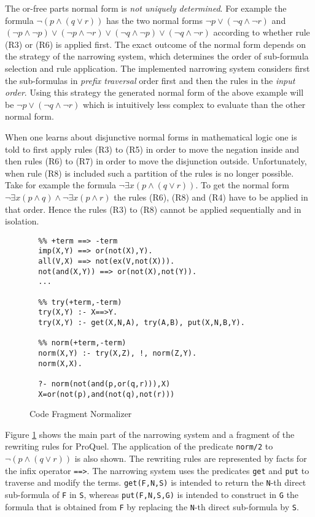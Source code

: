 The or-free parts normal form is {\em not uniquely determined}. For example the formula $\neg(p 
\wedge (q \vee r))$ has the two normal forms $\neg p \vee (\neg q \wedge \neg r)$ and $(\neg p 
\wedge \neg p)\vee (\neg p \wedge \neg r) \vee (\neg q \wedge \neg p) \vee (\neg q \wedge \neg r)$ 
according to whether rule (R3) or (R6) is applied first. The exact outcome of the normal form 
depends on the strategy of the narrowing system, which determines the order of sub-formula
selection and rule application. The implemented narrowing system considers first the
sub-formulas in {\em prefix traversal} order first and then the rules in the {\em input order}. 
Using this strategy the generated normal form of the above example will be $\neg p \vee 
(\neg q \wedge \neg r)$ which is intuitively less complex to evaluate than the other normal 
form.

When one learns about disjunctive normal forms in mathematical logic one is told to first 
apply rules (R3) to (R5) in order to move the negation inside and then rules (R6) to (R7) in
order to move the disjunction outside. Unfortunately, when rule (R8) is included such a 
partition of the rules is no longer possible. Take for example the formula $\neg \exists x 
(p\wedge (q \vee r))$. To get the normal form $\neg \exists x (p \wedge q) \wedge \neg \exists x
(p \wedge r)$ the rules (R6), (R8) and (R4) have to be applied in that order. Hence the rules
(R3) to (R8) cannot be applied sequentially and in isolation.

\begin{figure}
{\small
\begin{verbatim}
  %% +term ==> -term
  imp(X,Y) ==> or(not(X),Y).
  all(V,X) ==> not(ex(V,not(X))).
  not(and(X,Y)) ==> or(not(X),not(Y)).
  ...

  %% try(+term,-term)
  try(X,Y) :- X==>Y.
  try(X,Y) :- get(X,N,A), try(A,B), put(X,N,B,Y).

  %% norm(+term,-term)
  norm(X,Y) :- try(X,Z), !, norm(Z,Y).
  norm(X,X).

  ?- norm(not(and(p,or(q,r))),X)
  X=or(not(p),and(not(q),not(r)))
\end{verbatim}
}
\caption{Code Fragment Normalizer}
\label{prgnorm}
\end{figure}

Figure \ref{prgnorm} shows the main part of the narrowing system and a fragment of the rewriting
rules for ProQuel. The application of the predicate \verb.norm/2. to $\neg(p \wedge (q \vee r))$ 
is also shown. The rewriting rules are represented by facts for the infix operator \verb/==>/. 
The narrowing system uses the predicates \verb.get. and \verb.put. to traverse and modify the 
terms. \verb.get(F,N,S). is intended to return the \verb.N.-th direct sub-formula of \verb.F. in 
\verb.S., whereas \verb.put(F,N,S,G). is intended to construct in \verb.G. the formula that is 
obtained from \verb.F. by replacing the \verb.N.-th direct sub-formula by \verb.S..

